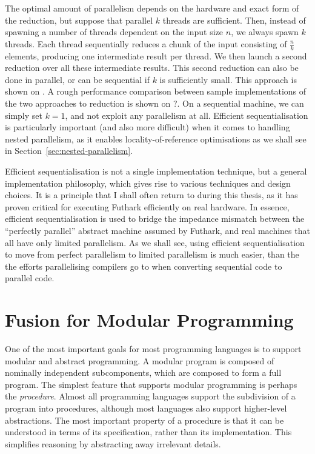 The optimal amount of parallelism depends on the hardware and exact
form of the reduction, but suppose that parallel $k$ threads are
sufficient.  Then, instead of spawning a number of threads dependent
on the input size $n$, we always spawn $k$ threads.  Each thread
sequentially reduces a chunk of the input consisting of $\frac{n}{k}$
elements, producing one intermediate result per thread.  We then
launch a second reduction over all these intermediate results.  This
second reduction can also be done in parallel, or can be sequential if
$k$ is sufficiently small.  This approach is shown on
.  A rough performance comparison
between sample implementations of the two approaches to reduction is
shown on ?.  On a sequential machine,
we can simply set $k=1$, and not exploit any parallelism at all.
Efficient sequentialisation is particularly important (and also more
difficult) when it comes to handling nested parallelism, as it enables
locality-of-reference optimisations as we shall see in
Section~\ref{sec:nested-parallelism}.

Efficient sequentialisation is not a single implementation technique,
but a general implementation philosophy, which gives rise to various
techniques and design choices.  It is a principle that I shall often
return to during this thesis, as it has proven critical for executing
Futhark efficiently on real hardware.  In essence, efficient
sequentialisation is used to bridge the impedance mismatch between the
``perfectly parallel'' abstract machine assumed by Futhark, and real
machines that all have only limited parallelism.  As we shall see,
using efficient sequentialisation to move from perfect parallelism to
limited parallelism is much easier, than the the efforts parallelising
compilers go to when converting sequential code to parallel code.

\section{Fusion for Modular Programming}

One of the most important goals for most programming languages is to
support modular and abstract programming.  A modular program is
composed of nominally independent subcomponents, which are composed to
form a full program.  The simplest feature that supports modular
programming is perhaps the \textit{procedure}.  Almost all programming
languages support the subdivision of a program into procedures,
although most languages also support higher-level abstractions.  The
most important property of a procedure is that it can be understood in
terms of its specification, rather than its implementation.  This
simplifies reasoning by abstracting away irrelevant details.

